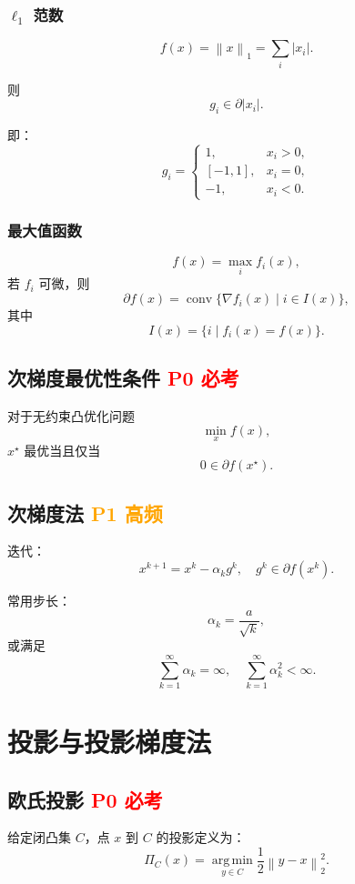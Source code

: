 \documentclass[11pt,a4paper]{ctexart}
\newcommand{\argmin}{\operatorname*{arg\,min}}
\newcommand{\norm}[1]{\left\lVert #1 \right\rVert}
\newcommand{\Pzero}{\textcolor{red}{\textbf{P0 必考}}}
\newcommand{\Pone}{\textcolor{orange}{\textbf{P1 高频}}}
\theoremstyle{definition}
\theoremstyle{plain}
\theoremstyle{remark}
\begin{document}
\subsubsection*{$\ell_1$ 范数}

\[
    f(x)=\norm{x}_1=\sum_i |x_i|.
\]

则
\[
    g_i \in \partial |x_i|.
\]

即：
\[
g_i =
\begin{cases}
    1, & x_i>0,\\
    [-1,1], & x_i=0,\\
    -1, & x_i<0.
\end{cases}
\]

\subsubsection*{最大值函数}

\[
    f(x)=\max_i f_i(x),
\]
若 $f_i$ 可微，则
\[
    \partial f(x)=
    \operatorname{conv}
    \{\nabla f_i(x)\mid i\in I(x)\},
\]
其中
\[
    I(x)=\{i\mid f_i(x)=f(x)\}.
\]

\subsection{次梯度最优性条件 \Pzero}

对于无约束凸优化问题
\[
    \min_x f(x),
\]
$x^\star$ 最优当且仅当
\[
    0\in\partial f(x^\star).
\]

\subsection{次梯度法 \Pone}

迭代：
\[
    x^{k+1}=x^k-\alpha_k g^k,
    \quad g^k\in\partial f(x^k).
\]

常用步长：
\[
    \alpha_k = \frac{a}{\sqrt{k}},
\]
或满足
\[
    \sum_{k=1}^{\infty}\alpha_k=\infty,
    \quad
    \sum_{k=1}^{\infty}\alpha_k^2<\infty.
\]

\section{投影与投影梯度法}

\subsection{欧氏投影 \Pzero}

给定闭凸集 $C$，点 $x$ 到 $C$ 的投影定义为：
\[
    \Pi_C(x)=\argmin_{y\in C}\frac12\norm{y-x}_2^2.
\]
\end{document}

